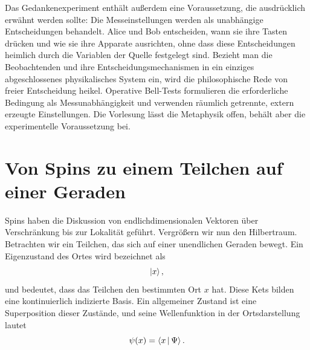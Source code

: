 \begin{classroomqa}
\end{classroomqa}

Das Gedankenexperiment enthält außerdem eine Voraussetzung, die ausdrücklich erwähnt werden sollte: Die Messeinstellungen werden als unabhängige Entscheidungen behandelt. Alice und Bob entscheiden, wann sie ihre Tasten drücken und wie sie ihre Apparate ausrichten, ohne dass diese Entscheidungen heimlich durch die Variablen der Quelle festgelegt sind. Bezieht man die Beobachtenden und ihre Entscheidungsmechanismen in ein einziges abgeschlossenes physikalisches System ein, wird die philosophische Rede von freier Entscheidung heikel. Operative Bell-Tests formulieren die erforderliche Bedingung als Messunabhängigkeit und verwenden räumlich getrennte, extern erzeugte Einstellungen. Die Vorlesung lässt die Metaphysik offen, behält aber die experimentelle Voraussetzung bei.

\begin{classroomqa}
\end{classroomqa}

\section{Von Spins zu einem Teilchen auf einer Geraden}

Spins haben die Diskussion von endlichdimensionalen Vektoren über Verschränkung bis zur Lokalität geführt. Vergrößern wir nun den Hilbertraum. Betrachten wir ein Teilchen, das sich auf einer unendlichen Geraden bewegt. Ein Eigenzustand des Ortes wird bezeichnet als
\begin{equation}
\left\lvert x\right\rangle,
\end{equation}
und bedeutet, dass das Teilchen den bestimmten Ort \(x\) hat. Diese Kets bilden eine kontinuierlich indizierte Basis. Ein allgemeiner Zustand ist eine Superposition dieser Zustände, und seine Wellenfunktion in der Ortsdarstellung lautet
\begin{equation}
\psi(x)=\left\langle x\,\middle|\,\Psi\right\rangle.
\label{eq:l8-position-wavefunction}
\end{equation}

